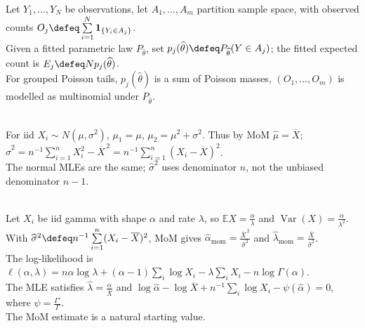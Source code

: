 \begin{remark} \label{rem:grouped-poisson-fit-expected-cell-counts} \\
Let $Y_1,\ldots,Y_N$ be observations, let $A_1,\ldots,A_m$ partition sample space, with observed counts $O_j\defeq\sum\limits_{i=1}^{N}\mathbf{1}_{\{Y_i\in A_j\}}$.\\
Given a fitted parametric law $P_{\widehat{\theta}}$, set $p_j(\widehat{\theta})\defeq P_{\widehat{\theta}}(Y\in A_j)$; the fitted expected count is $E_j\defeq Np_j(\widehat{\theta})$.\\
For grouped Poisson tails, $p_j(\widehat{\theta})$ is a sum of Poisson masses, $(O_1,\ldots,O_m)$ is modelled as multinomial under $P_{\widehat{\theta}}$.
\end{remark}

\begin{example} \label{ex:normal-moments-and-mle} \\
For iid $X_i\sim N(\mu,\sigma^2)$, $\mu_1=\mu$, $\mu_2=\mu^2+\sigma^2$. Thus by MoM $\widehat{\mu}=\overline{X}$; $\widehat{\sigma}^2=n^{-1}\sum\limits_{i=1}^{n}X_i^2-\overline{X}^{\,2}=n^{-1}\sum\limits_{i=1}^{n}(X_i-\overline{X})^2$.\\
The normal MLEs are the same; $\widehat{\sigma}^2$ uses denominator $n$, not the unbiased denominator $n-1$.
\end{example}

\begin{example} \label{ex:gamma-moments-and-likelihood-equations} \\
Let $X_i$ be iid gamma with shape $\alpha$ and rate $\lambda$, so $\mathbb{E}X=\frac{\alpha}{\lambda}$ and $\operatorname{Var}(X)=\frac{\alpha}{\lambda^2}$.\\
With $\widehat{\sigma}^2\defeq n^{-1}\sum\limits_{i=1}^{n}(X_i-\overline{X})^2$, MoM gives $\widehat{\alpha}_{\mathrm{mom}}=\frac{\overline{X}^{\,2}}{\widehat{\sigma}^2}$ and $\widehat{\lambda}_{\mathrm{mom}}=\frac{\overline{X}}{\widehat{\sigma}^2}$.\\
The log-likelihood is $\ell(\alpha,\lambda)=n\alpha\log\lambda+(\alpha-1)\sum\limits_i\log X_i-\lambda\sum\limits_iX_i-n\log\Gamma(\alpha)$.\\
The MLE satisfies $\widehat{\lambda}=\frac{\widehat{\alpha}}{\overline{X}}$ and $\log\widehat{\alpha}-\log\overline{X}+n^{-1}\sum\limits_i\log X_i-\psi(\widehat{\alpha})=0$, where $\psi=\frac{\Gamma'}{\Gamma}$.\\
The MoM estimate is a natural starting value.
\end{example}


